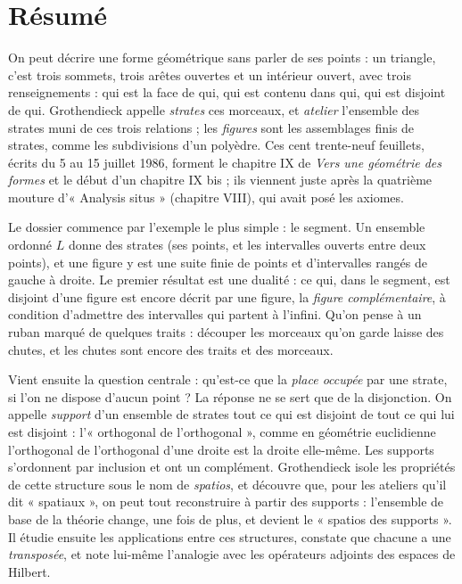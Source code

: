 \documentclass[11pt,a4paper]{article}
\begin{document}
\section*{Résumé}

\begin{resume}
On peut décrire une forme géométrique sans parler de ses points : un triangle,
c'est trois sommets, trois arêtes ouvertes et un intérieur ouvert, avec trois
renseignements : qui est la face de qui, qui est contenu dans qui, qui est
disjoint de qui. Grothendieck appelle \emph{strates} ces morceaux, et
\emph{atelier} l'ensemble des strates muni de ces trois relations ; les
\emph{figures} sont les assemblages finis de strates, comme les subdivisions
d'un polyèdre. Ces cent trente-neuf feuillets, écrits du 5 au 15 juillet 1986,
forment le chapitre IX de \emph{Vers une géométrie des formes} et le début d'un
chapitre IX bis ; ils viennent juste après la quatrième mouture d'« Analysis
situs » (chapitre VIII), qui avait posé les axiomes.

Le dossier commence par l'exemple le plus simple : le segment. Un ensemble
ordonné $L$ donne des strates (ses points, et les intervalles ouverts entre
deux points), et une figure y est une suite finie de points et
d'intervalles rangés de gauche à droite. Le premier résultat est une dualité :
ce qui, dans le segment, est disjoint d'une figure est encore décrit par une
figure, la \emph{figure complémentaire}, à condition d'admettre des intervalles
qui partent à l'infini. Qu'on pense à un ruban marqué de quelques traits :
découper les morceaux qu'on garde laisse des chutes, et les chutes sont encore
des traits et des morceaux.

Vient ensuite la question centrale : qu'est-ce que la \emph{place occupée} par
une strate, si l'on ne dispose d'aucun point ? La réponse ne se sert que de la
disjonction. On appelle \emph{support} d'un ensemble de strates tout ce qui est
disjoint de tout ce qui lui est disjoint : l'« orthogonal de l'orthogonal »,
comme en géométrie euclidienne l'orthogonal de l'orthogonal d'une droite est la
droite elle-même. Les supports s'ordonnent par inclusion et ont un complément.
Grothendieck isole les propriétés de cette structure sous le nom de
\emph{spatios}, et découvre que, pour les ateliers qu'il dit « spatiaux », on
peut tout reconstruire à partir des supports : l'ensemble de base de la théorie
change, une fois de plus, et devient le « spatios des supports ». Il étudie
ensuite les applications entre ces structures, constate que chacune a une
\emph{transposée}, et note lui-même l'analogie avec les opérateurs adjoints des
espaces de Hilbert.


\end{resume}
\end{document}
